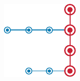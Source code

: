 \documentclass[xetex]{beamer}
\begin{document}
\begin{frame}
\begin{columns}[T]
\begin{column}{0.5\textwidth}
		\end{column}
	\end{columns}
	
	\vspace{-12em}
	
	\hfill\includegraphics[]{grafikk/toc.pdf}
	
\addtocounter{framenumber}{-1}
\thispagestyle{empty}
\end{frame}
\end{document}
